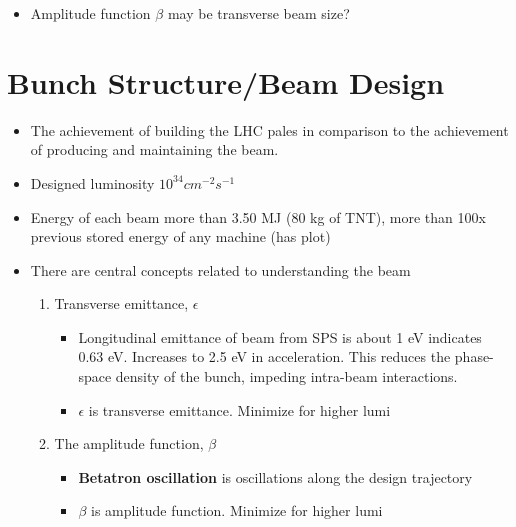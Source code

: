 \begin{itemize}
    \item Amplitude function $\beta$ may be transverse beam size? \cite{boussard}
\end{itemize}

\section{Bunch Structure/Beam Design}
\begin{itemize}
    \item The achievement of building the LHC pales in comparison to the achievement of producing and maintaining the beam.
    \item Designed luminosity $10^{34}cm^{-2}s^{-1}$ \cite{lyndon}
    \item Energy of each beam more than 3.50 MJ (80 kg of TNT), more than 100x previous stored energy of any machine (has plot) \cite{lyndon}
    \item There are central concepts related to understanding the beam
    \begin{enumerate}\scriptsize
        \item Transverse emittance, $\epsilon$
        \begin{itemize}\scriptsize
            \item Longitudinal emittance of beam from SPS is about 1 eV {\color{blue} \cite{boussard} indicates 0.63 eV}. Increases to 2.5 eV in acceleration. This reduces the phase-space density of the bunch, impeding intra-beam interactions. \cite{lyndon}
            \item $\epsilon$ is transverse emittance. Minimize for higher lumi \cite{pdgAccelSection}
        \end{itemize}
        \item The amplitude function, $\beta$
        \begin{itemize}\scriptsize
            \item \textbf{Betatron oscillation} is oscillations along the design trajectory \cite{pdgAccelSection}
            \item $\beta$ is amplitude function. Minimize for higher lumi \cite{pdgAccelSection}
        \end{itemize}

\end{enumerate}
\end{itemize}
